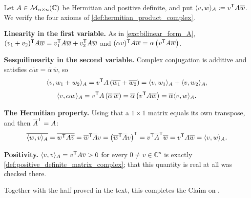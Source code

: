 \begin{exercisesolution}
\label{sol:pos_def_gives_hermitian_product}
  Let $A \in \mathcal{M}_{n \times n}(\mathbb{C})$ be Hermitian and positive definite, and put $\langle v, w \rangle_A := v^{\mathsf{T}} A \overline{w}$. We verify the four axioms of \cref{def:hermitian_product_complex}.

  \textbf{Linearity in the first variable.} As in \cref{exc:bilinear_form_A}, $(v_1 + v_2)^{\mathsf{T}} A \overline{w} = v_1^{\mathsf{T}} A \overline{w} + v_2^{\mathsf{T}} A \overline{w}$ and $(\alpha v)^{\mathsf{T}} A \overline{w} = \alpha \left( v^{\mathsf{T}} A \overline{w} \right)$.

  \textbf{Sesquilinearity in the second variable.} Complex conjugation is additive and satisfies $\overline{\alpha w} = \overline{\alpha} \, \overline{w}$, so
  \[ \langle v, w_1 + w_2 \rangle_A = v^{\mathsf{T}} A \left( \overline{w_1} + \overline{w_2} \right) = \langle v, w_1 \rangle_A + \langle v, w_2 \rangle_A, \]
  \[ \langle v, \alpha w \rangle_A = v^{\mathsf{T}} A \left( \overline{\alpha} \, \overline{w} \right) = \overline{\alpha} \left( v^{\mathsf{T}} A \overline{w} \right) = \overline{\alpha} \langle v, w \rangle_A. \]

  \textbf{The Hermitian property.} Using that a $1 \times 1$ matrix equals its own transpose, and then $\overline{A}^{\mathsf{T}} = A$:
  \[ \overline{\langle w, v \rangle_A} = \overline{w^{\mathsf{T}} A \overline{v}} = \overline{w}^{\mathsf{T}} \overline{A} v = \left( \overline{w}^{\mathsf{T}} \overline{A} v \right)^{\mathsf{T}} = v^{\mathsf{T}} \overline{A}^{\mathsf{T}} \overline{w} = v^{\mathsf{T}} A \overline{w} = \langle v, w \rangle_A. \]

  \textbf{Positivity.} $\langle v, v \rangle_A = v^{\mathsf{T}} A \overline{v} > 0$ for every $0 \ne v \in \mathbb{C}^n$ is exactly \cref{def:positive_definite_matrix_complex}; that this quantity is real at all was checked there.

  Together with the half proved in the text, this completes the Claim on .
\end{exercisesolution}

